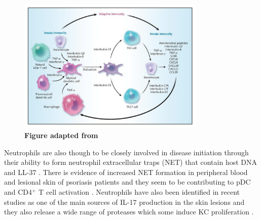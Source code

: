 \begin{figure}[htbp]
\centering
\includegraphics[width=0.8\textwidth]{./Introduction/pdfs/PSO_adaptive_innate_immune_system_crosstalk.pdf}
\caption[Crosstalk between innate and adaptive immunity in psoriasis]{\textbf{Figure adapted from \parencite{Nestle2009}}}
\label{fig:PSO_immune_system_diagram}
\end{figure}


Neutrophils are also though to be closely involved in disease initiation through their ability to form neutrophil extracellular traps (NET) that contain host DNA and LL-37 \parencite{Hu2016}. There is evidence of increased NET formation in peripheral blood and lesional skin of psoriasis patients and they seem to be contributing to pDC and CD4$^+$ T cell activation \parencite{Hu2016}. Neutrophils have also been identified in recent studies as one of the main sources of IL-17 production in the skin lesions \parencite{Lin2011} and they also release a wide range of proteases which some induce KC proliferation \parencite{Mahil2006}.


%
%


